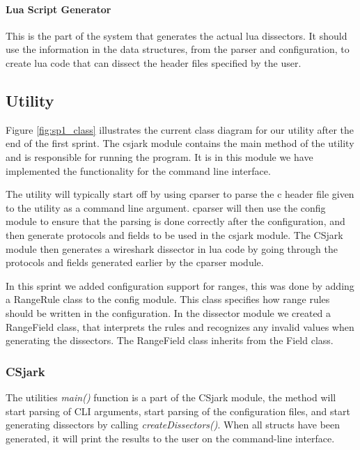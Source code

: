 \paragraph{Lua Script Generator}
This is the part of the system that generates the actual \Gls{lua} \glspl{dissector}.
It should use the information in the data structures, from the 
parser and configuration, to create \Gls{lua} code that can dissect
the \gls{header} files specified by the user. 

\subsection{Utility}
Figure \ref{fig:sp1_class} illustrates the current class diagram for our
\gls{utility} after the end of the first sprint. The csjark module contains the main
method of the \gls{utility} and is responsible for running the program.
It is in this module we have implemented the functionality for the command line interface.

The \gls{utility} will typically start off by using cparser to parse the \Gls{c} \gls{header} file given to
the \gls{utility} as a command line argument. cparser will then use the config module
to ensure that the parsing is done correctly after the configuration, and then
generate protocols and fields to be used in the csjark module. The CSjark
module then generates a \Gls{wireshark} \gls{dissector} in \Gls{lua} code by going through the
protocols and fields generated earlier by the cparser module.

In this sprint we added configuration support for ranges, this was done 
by adding a RangeRule class to the config module. This class specifies how
range rules should be written in the configuration. In the \gls{dissector} module
we created a RangeField class, that interprets the rules
and recognizes any invalid values when generating the \glspl{dissector}.
The RangeField class inherits from the Field class.

\subsubsection{CSjark}
The utilities \emph{main()} function is a part of the CSjark module, the method will start parsing of CLI arguments, start parsing of the configuration files, and start generating dissectors by calling \emph{createDissectors()}. When all structs have been generated, it will print the results to the user on the command-line interface.

